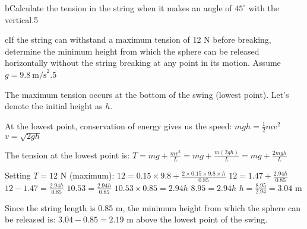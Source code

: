 \begin{problem}{15}
\begin{part}{b}{Calculate the tension in the string when it makes an angle of $45^\circ$ with the vertical.}{5}
\begin{solution}
\end{solution}
\end{part}

\begin{part}{c}{If the string can withstand a maximum tension of 12 N before breaking, determine the minimum height from which the sphere can be released horizontally without the string breaking at any point in its motion. Assume $g = 9.8~\text{m/s}^2$.}{5}
\begin{solution}
The maximum tension occurs at the bottom of the swing (lowest point). Let's denote the initial height as $h$.

At the lowest point, conservation of energy gives us the speed:
$mgh = \frac{1}{2}mv^2$
$v = \sqrt{2gh}$

The tension at the lowest point is:
$T = mg + \frac{mv^2}{L} = mg + \frac{m(2gh)}{L} = mg + \frac{2mgh}{L}$

Setting $T = 12$ N (maximum):
$12 = 0.15 \times 9.8 + \frac{2 \times 0.15 \times 9.8 \times h}{0.85}$
$12 = 1.47 + \frac{2.94h}{0.85}$
$12 - 1.47 = \frac{2.94h}{0.85}$
$10.53 = \frac{2.94h}{0.85}$
$10.53 \times 0.85 = 2.94h$
$8.95 = 2.94h$
$h = \frac{8.95}{2.94} = 3.04$ m

Since the string length is 0.85 m, the minimum height from which the sphere can be released is:
$3.04 - 0.85 = 2.19$ m above the lowest point of the swing.

\end{solution}
\end{part}

\end{problem} 